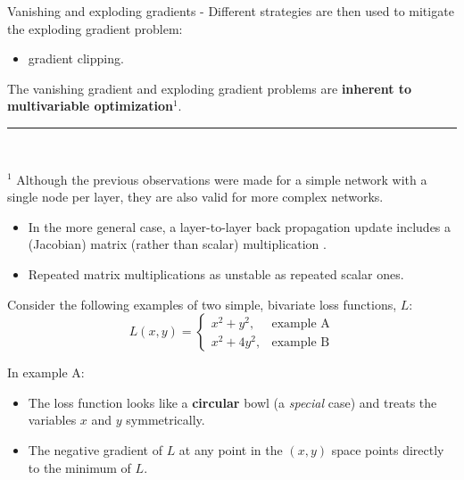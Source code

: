 \begin{frame}[t,allowframebreaks]{
    Vanishing and exploding gradients -}
    Different strategies are then used to mitigate the 
    \gls{exploding gradient} problem:
    \begin{itemize}
        \item 
         \gls{gradient} clipping.\\
    \end{itemize}    
    \vspace{0.3cm}

    The
    \gls{vanishing gradient} and
    \gls{exploding gradient} problems are
    {\bf inherent to multivariable optimization}$^1$.\\

    \vspace{0.4cm}

    \noindent\rule{4cm}{0.4pt}\\
    {
    \scriptsize
    $^1$ Although the previous observations were made for a simple network
    with a single node per layer, they are also valid for more complex networks.\\
    \begin{itemize}
        \scriptsize
        \item In the more general case, a layer-to-layer 
        \gls{back propagation} update includes 
        a (\gls{Jacobian}) matrix (rather than scalar) multiplication         
        \cite{Aggarwal:2018SpringerDL}.
        \item Repeated matrix multiplications as unstable as
        repeated scalar ones.
    \end{itemize}
    }

    \framebreak


    Consider the following examples of two simple, bivariate 
    \glspl{loss function}, $L$:\\
    \vspace{-0.2cm}
    \begin{equation}
        L(x,y) = 
        \begin{cases}
            x^2 + y^2,  & \text{example A} \\
            x^2 + 4y^2, & \text{example B}
        \end{cases}
    \end{equation}

    \vspace{-0.3cm}

    In example A:\\
    \begin{itemize}
        \small
        \item The \gls{loss function} looks like a {\bf circular} bowl
        (a {\em special} case) and treats the variables $x$ and $y$ symmetrically.
        \item The negative \gls{gradient} of $L$ at any point in the 
        $(x,y)$ space points directly to the minimum of $L$.\\
    \end{itemize}


\end{frame}
